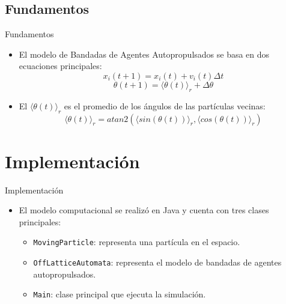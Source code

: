 \documentclass{beamer}
\begin{document}
        \subsection{Fundamentos}

            \begin{frame}{Fundamentos}
                \begin{itemize}
                    \item El modelo de Bandadas de Agentes Autopropulsados se basa en dos ecuaciones principales:
                        \begin{equation}
                            x_i(t+1) = x_i(t) + v_i(t) \Delta t\label{eq:equation1}
                        \end{equation}
                        \begin{equation}
                            \theta(t+1) = \langle \theta(t) \rangle_r+ \Delta \theta\label{eq:equation2}
                        \end{equation}
                    \item El $\langle \theta(t) \rangle_r$ es el promedio de los ángulos de las partículas vecinas:
                        \begin{equation}
                            \langle \theta(t) \rangle_r = atan2(\langle sin(\theta(t)) \rangle_r, \langle cos(\theta(t)) \rangle_r)
                        \end{equation}
                \end{itemize}
            \end{frame}

    \section{Implementación}

        \begin{frame}{Implementación}
            \begin{itemize}
                \item El modelo computacional se realizó en Java y cuenta con tres clases principales:
                \begin{itemize}
                    \item \texttt{MovingParticle}: representa una partícula en el espacio.
                    \item \texttt{OffLatticeAutomata}: representa el modelo de bandadas de agentes autopropulsados.
                    \item \texttt{Main}: clase principal que ejecuta la simulación.
                \end{itemize}
            \end{itemize}
        \end{frame}
\end{document}
